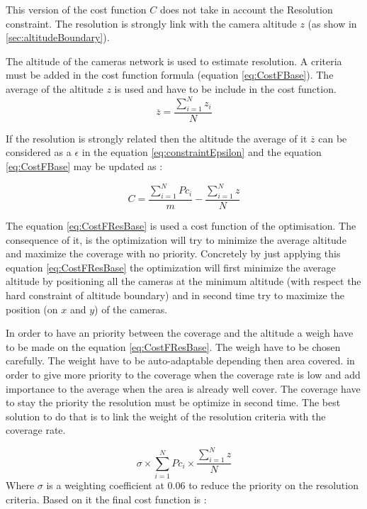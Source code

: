 This version of the cost function $C$ does not take in account the Resolution constraint. The resolution is  strongly link with the camera altitude $z$ (as show in \ref{sec:altitudeBoundary}).

The altitude of the cameras network is used to estimate resolution. A criteria must be added in the cost function formula (equation \ref{eq:CostFBase}).  The average of the altitude $z$ is used and have to be include in the cost function.
 \begin{equation}\label{eq:CostFResolutionPart1}
\overline{z}= \frac{\sum_{i=1}^N z_i}{N}     
\end{equation}

 If the resolution is strongly related then the altitude the average of it $\overline{z}$ can be considered as a   $\epsilon$  in the equation \ref{eq:constraintEpsilon} and the equation \ref{eq:CostFBase} may be updated as : 
 
 \begin{equation}\label{eq:CostFResBase}
C =  \frac{\sum_{i=1}^N {Pc_i}}{m}  - \frac{\sum_{i=1}^N z}{N}     
\end{equation}
 
The equation \ref{eq:CostFResBase} is used a cost function of the optimisation. The consequence of it, is the optimization will try to minimize the average altitude and maximize the coverage with no priority. Concretely  by just applying this equation  \ref{eq:CostFResBase} the optimization will first minimize the average altitude by positioning all the cameras at the minimum altitude (with respect the hard constraint of altitude boundary) and in second time try to maximize the position (on $x$ and $y$) of the cameras. 

In order to have an  priority  between the coverage and the altitude a weigh have to be made on the equation \ref{eq:CostFResBase}. The  weigh have to be chosen carefully.
The weight have to be auto-adaptable depending then area covered. in order to give more priority to the coverage when the coverage rate is low and add importance to the average  when the area is already well  cover. The coverage have to stay the priority the resolution must be optimize in second time.
The best solution  to do that is to   link the weight of the resolution criteria with the coverage rate.

\begin{equation}\label{eq:CostFResPondere}
  \sigma \times \sum_{i=1}^N {Pc_i} \times \frac{\sum_{i=1}^N z}{N}     
\end{equation}
Where $\sigma$ is a weighting coefficient at 0.06 to reduce the priority on the resolution criteria. 
Based on it the  final cost function is : 

